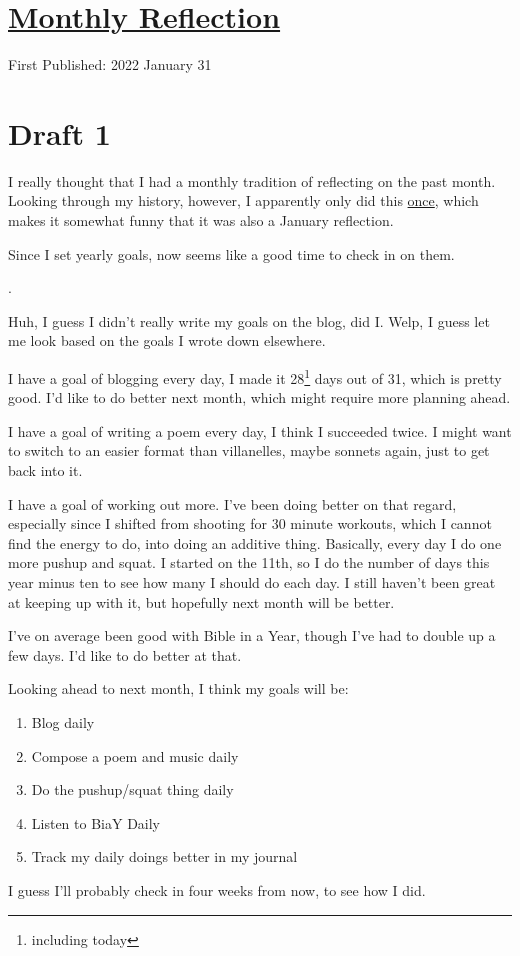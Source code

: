 \documentclass[12pt]{article}[titlepage]
\renewcommand{\,}{\textsuperscript{,}}
\begin{document}
\doublespacing
\section{\href{reflection-january-22.html}{Monthly Reflection}}
First Published: 2022 January 31

\section{Draft 1}
I really thought that I had a monthly tradition of reflecting on the past month.
Looking through my history, however, I apparently only did this \href{reflection-january-19}{once}, which makes it somewhat funny that it was also a January reflection.

Since I set yearly goals, now seems like a good time to check in on them.

.

Huh,  I guess I didn't really write my goals on the blog, did I.
Welp, I guess let me look based on the goals I wrote down elsewhere.

I have a goal of blogging every day, I made it 28\footnote{including today} days out of 31, which is pretty good.
I'd like to do better next month, which might require more planning ahead.

I have a goal of writing a poem every day, I think I succeeded twice.
I might want to switch to an easier format than villanelles, maybe sonnets again, just to get back into it.

I have a goal of working out more.
I've been doing better on that regard, especially since I shifted from shooting for 30 minute workouts, which I cannot find the energy to do, into doing an additive thing.
Basically, every day I do one more pushup and squat.
I started on the 11th, so I do the number of days this year minus ten to see how many I should do each day.
I still haven't been great at keeping up with it, but hopefully next month will be better.

I've on average been good with Bible in a Year, though I've had to double up a few days.
I'd like to do better at that.

Looking ahead to next month, I think my goals will be:
\begin{enumerate}
\item Blog daily
\item Compose a poem and music daily
\item Do the pushup/squat thing daily
\item Listen to BiaY Daily
\item Track my daily doings better in my journal
\end{enumerate}
I guess I'll probably check in four weeks from now, to see how I did.
\end{document}
